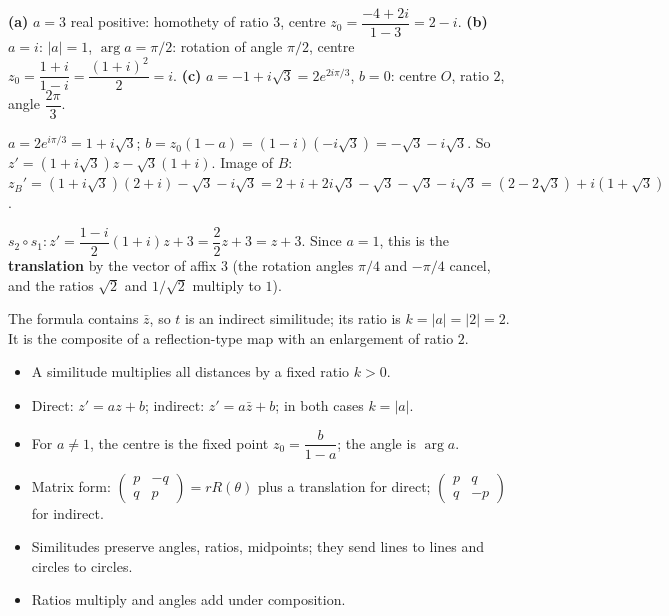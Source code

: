 \documentclass[11pt]{article}
\begin{document}
\begin{corrige}[Exercise 1]
\textbf{(a)} $a = 3$ real positive: homothety of ratio $3$, centre $z_0 = \dfrac{-4+2i}{1-3} = 2 - i$.
\textbf{(b)} $a = i$: $|a| = 1$, $\arg a = \pi/2$: rotation of angle $\pi/2$, centre $z_0 = \dfrac{1+i}{1-i} = \dfrac{(1+i)^2}{2} = i$.
\textbf{(c)} $a = -1 + i\sqrt{3} = 2e^{2i\pi/3}$, $b = 0$: centre $O$, ratio $2$, angle $\dfrac{2\pi}{3}$.
\end{corrige}

\begin{corrige}[Exercise 2]
$a = 2e^{i\pi/3} = 1 + i\sqrt{3}$; $b = z_0(1-a) = (1-i)(-i\sqrt{3}) = -\sqrt{3} - i\sqrt{3}$. So $z' = (1+i\sqrt{3})z - \sqrt{3}(1 + i)$. Image of $B$: $z_B' = (1+i\sqrt3)(2+i) - \sqrt3 - i\sqrt3 = 2 + i + 2i\sqrt3 - \sqrt3 - \sqrt3 - i\sqrt3 = (2 - 2\sqrt3) + i(1 + \sqrt3)$.
\end{corrige}

\begin{corrige}[Exercise 3]
$s_2 \circ s_1: z' = \dfrac{1-i}{2}(1+i)z + 3 = \dfrac{2}{2}z + 3 = z + 3$. Since $a = 1$, this is the \textbf{translation} by the vector of affix $3$ (the rotation angles $\pi/4$ and $-\pi/4$ cancel, and the ratios $\sqrt2$ and $1/\sqrt2$ multiply to $1$).
\end{corrige}

\begin{corrige}[Exercise 4]
The formula contains $\bar{z}$, so $t$ is an indirect similitude; its ratio is $k = |a| = |2| = 2$. It is the composite of a reflection-type map with an enlargement of ratio $2$.
\end{corrige}

\begin{aretenir}
\begin{itemize}
\item A similitude multiplies all distances by a fixed ratio $k > 0$.
\item Direct: $z' = az + b$; indirect: $z' = a\bar{z} + b$; in both cases $k = |a|$.
\item For $a \neq 1$, the centre is the fixed point $z_0 = \dfrac{b}{1-a}$; the angle is $\arg a$.
\item Matrix form: $\begin{pmatrix} p & -q \\ q & p \end{pmatrix} = rR(\theta)$ plus a translation for direct; $\begin{pmatrix} p & q \\ q & -p \end{pmatrix}$ for indirect.
\item Similitudes preserve angles, ratios, midpoints; they send lines to lines and circles to circles.
\item Ratios multiply and angles add under composition.
\end{itemize}
\end{aretenir}
\end{document}
